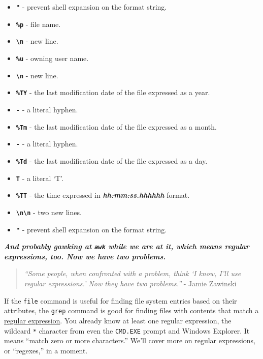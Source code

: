\documentclass[10pt,]{book}
\numberwithin{figure}{chapter}
\begin{document}
\begin{itemize}
\itemsep1pt\parskip0pt
\item
  \textbf{\texttt{"}} - prevent shell expansion on the format string.
\item
  \textbf{\texttt{\%p}} - file name.
\item
  \textbf{\texttt{\textbackslash{}n}} - new line.
\item
  \textbf{\texttt{\%u}} - owning user name.
\item
  \textbf{\texttt{\textbackslash{}n}} - new line.
\item
  \textbf{\texttt{\%TY}} - the last modification date of the file
  expressed as a year.
\item
  \textbf{\texttt{-}} - a literal hyphen.
\item
  \textbf{\texttt{\%Tm}} - the last modification date of the file
  expressed as a month.
\item
  \textbf{\texttt{-}} - a literal hyphen.
\item
  \textbf{\texttt{\%Td}} - the last modification date of the file
  expressed as a day.
\item
  \textbf{\texttt{T}} - a literal `T'.
\item
  \textbf{\texttt{\%TT}} - the time expressed in
  \textbf{\emph{hh:mm:ss.hhhhhh}} format.
\item
  \textbf{\texttt{\textbackslash{}n\textbackslash{}n}} - two new lines.
\item
  \textbf{\texttt{"}} - prevent shell expansion on the format string.
\end{itemize}


\textbf{\emph{And probably gawking at \texttt{awk} while we are at it,
which means regular expressions, too. Now we have two problems.}}

\begin{quote}
\emph{``Some people, when confronted with a problem, think `I know, I'll
use regular expressions.' Now they have two problems.''} - Jamie
Zawinski
\end{quote}

If the \texttt{file} command is useful for finding file system entries
based on their attributes, the
\href{http://linux.die.net/man/1/grep}{\texttt{grep}} command is good
for finding files with contents that match a
\href{https://en.wikipedia.org/wiki/Regular_expression}{regular
expression}. You already know at least one regular expression, the
wildcard \texttt{*} character from even the \texttt{CMD.EXE} prompt and
Windows Explorer. It means ``match zero or more characters.'' We'll
cover more on regular expressions, or ``regexes,'' in a moment.
\end{document}
